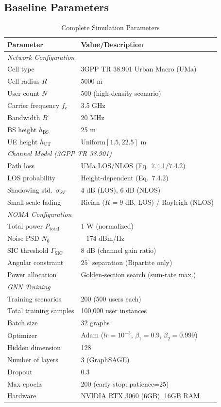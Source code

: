 \documentclass[conference]{IEEEtran}
\begin{document}
\subsection{Baseline Parameters}
\begin{table}[!t]
\centering
\caption{Complete Simulation Parameters}
\label{tab:sim_params}
\begin{tabular}{l l}
\toprule
\textbf{Parameter} & \textbf{Value/Description} \\
\midrule
\multicolumn{2}{l}{\textit{Network Configuration}} \\
Cell type & 3GPP TR 38.901 Urban Macro (UMa) \\
Cell radius $R$ & 5000 m \\
User count $N$ & 500 (high-density scenario) \\
Carrier frequency $f_c$ & 3.5 GHz \\
Bandwidth $B$ & 20 MHz \\
BS height $h_{\mathrm{BS}}$ & 25 m \\
UE height $h_{\mathrm{UT}}$ & Uniform$[1.5, 22.5]$ m \\
\midrule
\multicolumn{2}{l}{\textit{Channel Model (3GPP TR 38.901)}} \\
Path loss & UMa LOS/NLOS (Eq.~7.4.1/7.4.2) \\
LOS probability & Height-dependent (Eq.~7.4.2) \\
Shadowing std.\ $\sigma_{SF}$ & 4 dB (LOS), 6 dB (NLOS) \\
Small-scale fading & Rician ($K=9$ dB, LOS) / Rayleigh (NLOS) \\
\midrule
\multicolumn{2}{l}{\textit{NOMA Configuration}} \\
Total power $P_{\mathrm{total}}$ & 1 W (normalized) \\
Noise PSD $N_0$ & $-174$ dBm/Hz \\
SIC threshold $\Gamma_{\mathrm{SIC}}$ & 8 dB (channel gain ratio) \\
Angular constraint & $25^\circ$ separation (Bipartite only) \\
Power allocation & Golden-section search (sum-rate max.) \\
\midrule
\multicolumn{2}{l}{\textit{GNN Training}} \\
Training scenarios & 200 (500 users each) \\
Total training samples & 100,000 user instances \\
Batch size & 32 graphs \\
Optimizer & Adam ($lr=10^{-3}$, $\beta_1=0.9$, $\beta_2=0.999$) \\
Hidden dimension & 128 \\
Number of layers & 3 (GraphSAGE) \\
Dropout & 0.3 \\
Max epochs & 200 (early stop: patience=25) \\
Hardware & NVIDIA RTX 3060 (6GB), 16GB RAM \\
\bottomrule
\end{tabular}
\end{table}
\end{document}
